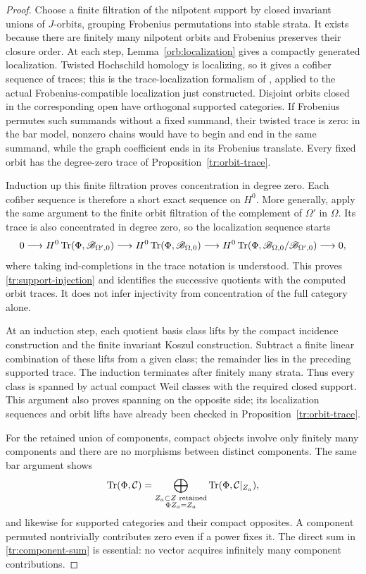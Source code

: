 \begin{proof}
Choose a finite filtration of the nilpotent support by closed invariant
unions of $J$-orbits, grouping Frobenius permutations into stable strata.
It exists because there are finitely many nilpotent orbits and
Frobenius preserves their closure order.  At each step,
Lemma~\ref{orb:localization} gives a compactly generated localization.
Twisted Hochschild homology is localizing, so it gives a cofiber
sequence of traces; this is the trace-localization formalism of
\cite[Theorem~3.4 and Proposition~5.4]{HSS}, applied to the actual
Frobenius-compatible localization just constructed.
Disjoint orbits closed in the corresponding open
have orthogonal supported categories.  If Frobenius permutes such
summands without a fixed summand, their twisted trace is zero: in the
bar model, nonzero chains would have to begin and end in the same
summand, while the graph coefficient ends in its Frobenius translate.
Every fixed orbit has the degree-zero trace of
Proposition~\ref{tr:orbit-trace}.

Induction up this finite filtration proves concentration in degree
zero.  Each cofiber sequence is therefore a short exact sequence on
$H^0$.  More generally, apply the same argument to the finite orbit
filtration of the complement of $\Omega'$ in $\Omega$.  Its trace is
also concentrated in degree zero, so the localization sequence starts
\[
 0\longrightarrow H^0\operatorname{Tr}(\Phi,\mathscr B_{\Omega',0})
 \longrightarrow H^0\operatorname{Tr}(\Phi,\mathscr B_{\Omega,0})
 \longrightarrow H^0\operatorname{Tr}(\Phi,\mathscr B_{\Omega,0}/
                                      \mathscr B_{\Omega',0})
 \longrightarrow0,
\]
where taking ind-completions in the trace notation is understood.
This proves \eqref{tr:support-injection} and identifies the successive
quotients with the computed orbit traces.  It does not infer
injectivity from concentration of the full category alone.

At an induction step, each quotient basis class lifts by the compact
incidence construction and the finite invariant Koszul construction.
Subtract a finite linear combination of these lifts from a given
class; the remainder lies in the preceding supported trace.
The induction terminates after finitely many strata.  Thus every
class is spanned by actual compact Weil classes with the required
closed support.  This argument also proves spanning on the opposite
side; its localization sequences and orbit lifts have already been
checked in Proposition~\ref{tr:orbit-trace}.

For the retained union of components, compact objects involve only
finitely many components and there are no morphisms between distinct
components.  The same bar argument shows
\begin{equation}\label{tr:component-sum}
 \operatorname{Tr}(\Phi,\mathcal C)
   =\bigoplus_{\substack{Z_a\subset Z\text{ retained}\\
                         \Phi Z_a=Z_a}}
          \operatorname{Tr}(\Phi,\mathcal C|_{Z_a}),
\end{equation}
and likewise for supported categories and their compact opposites.
A component permuted nontrivially contributes zero even if a power
fixes it.  The direct sum in \eqref{tr:component-sum} is essential:
no vector acquires infinitely many component contributions.


\end{proof}
